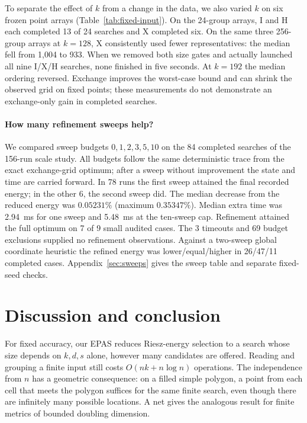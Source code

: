 \documentclass[a4paper,12pt]{article}
\numberwithin{equation}{section}
\begin{document}
To separate the effect of $k$ from a change in the data, we also varied $k$ on six frozen point
arrays (Table~\ref{tab:fixed-input}). On the 24-group arrays, I and H each completed 13 of 24
searches and X completed six. On the same three 256-group arrays at $k=128$, X consistently
used fewer representatives: the median fell from 1,004 to 933. When we removed both size gates
and actually launched all nine I/X/H searches, none finished in five seconds. At $k=192$ the
median ordering reversed. Exchange improves the worst-case bound and can shrink the observed
grid on fixed points; these measurements do not demonstrate an exchange-only gain in completed
searches.

\paragraph*{How many refinement sweeps help?}
We compared sweep budgets $0,1,2,3,5,10$ on the 84 completed searches of the 156-run scale study.
All budgets follow the same deterministic trace from the exact exchange-grid optimum; after a
sweep without improvement the state and time are carried forward. In 78 runs the first sweep
attained the final recorded energy; in the other 6, the second sweep did. The median decrease from
the reduced energy was $0.05231\%$ (maximum $0.35347\%$). Median extra time was 2.94~ms for one
sweep and 5.48~ms at the ten-sweep cap. Refinement attained the full optimum on 7 of 9 small
audited cases. The 3 timeouts and 69 budget exclusions supplied no refinement observations.
Against a two-sweep global coordinate heuristic the refined energy was lower/equal/higher in
26/47/11 completed cases. Appendix~\ref{sec:sweeps} gives the sweep table and separate fixed-seed
checks.

\section{Discussion and conclusion}\label{sec:conclusion}
For fixed accuracy, our EPAS reduces Riesz-energy selection to a search whose size depends on
$k,d,s$ alone, however many candidates are offered. Reading and grouping a finite input still
costs $O(nk+n\log n)$ operations. The independence from $n$ has a geometric consequence:
on a filled simple polygon, a point from each cell that meets the polygon suffices for the
same finite search, even though there are infinitely many possible locations. A net gives
the analogous result for finite metrics of bounded doubling dimension.
\end{document}
